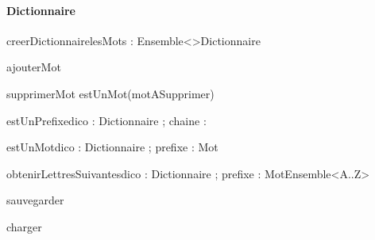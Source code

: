 \paragraph{Dictionnaire}
\begin{algorithme}

  \signaturefonction
  {creerDictionnaire}{lesMots : Ensemble<\chaine>}{Dictionnaire}

  \signatureProcedure
  {ajouterMot}{ }

  \signatureProcedureAvecPreconditions
  {supprimerMot}{ }{estUnMot(motASupprimer)}

  \signaturefonction
  {estUnPrefixe}{dico : Dictionnaire ; chaine : \chaine}{\booleen}

  \signaturefonction
  {estUnMot}{dico : Dictionnaire ; prefixe : Mot}{\booleen}

  \signaturefonction
  {obtenirLettresSuivantes}{dico : Dictionnaire ; prefixe : Mot}{Ensemble<A..Z>}

  \signatureProcedure
  {sauvegarder}{}

  \signatureProcedure
  {charger}{ }

\end{algorithme}

